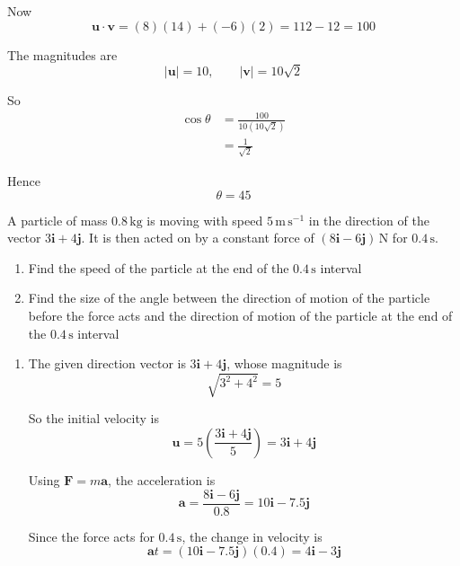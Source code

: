 \documentclass[leqno]{article}
\begin{document}
\begin{enumerate}[
  label=\textbf{\arabic*.},
  leftmargin=*,
  topsep=0pt,
  partopsep=0pt,
  parsep=0pt
]
\begin{djsSolution}
\begin{enumerate}[label=\textbf{(\alph*)}]
Now
\[
\mathbf{u}\cdot\mathbf{v}=(8)(14)+(-6)(2)=112-12=100
\]

The magnitudes are
\[
|\mathbf{u}|=10, \qquad |\mathbf{v}|=10\sqrt{2}
\]

So
\begin{align*}
\cos\theta
&=\frac{100}{10(10\sqrt{2})} \\
&=\frac{1}{\sqrt{2}}
\end{align*}

Hence
\[
\theta=45
\]
\end{enumerate}
\end{djsSolution}


\newpage

\questionitem

A particle of mass $0.8\,\mathrm{kg}$ is moving with speed $5\,\mathrm{m\,s^{-1}}$ in the direction of the vector $3\mathbf{i}+4\mathbf{j}$. It is then acted on by a constant force of $(8\mathbf{i}-6\mathbf{j})\,\mathrm{N}$ for $0.4\,\mathrm{s}$. \\

\begin{enumerate}[label=\textbf{(\alph*)}]
  \item Find the speed of the particle at the end of the $0.4\,\mathrm{s}$ interval  \\
  \item Find the size of the angle between the direction of motion of the particle before the force acts and the direction of motion of the particle at the end of the $0.4\,\mathrm{s}$ interval  \\
\end{enumerate}

\vspace*{10pt}

\begin{djsSolution}
\begin{enumerate}[label=\textbf{(\alph*)}]
  \item The given direction vector is $3\mathbf{i}+4\mathbf{j}$, whose magnitude is
  \[
  \sqrt{3^2+4^2}=5
  \]

  So the initial velocity is
  \[
  \mathbf{u}=5\left(\frac{3\mathbf{i}+4\mathbf{j}}{5}\right)=3\mathbf{i}+4\mathbf{j}
  \]

  Using $\mathbf{F}=m\mathbf{a}$, the acceleration is
  \[
  \mathbf{a}=\frac{8\mathbf{i}-6\mathbf{j}}{0.8}=10\mathbf{i}-7.5\mathbf{j}
  \]

  Since the force acts for $0.4\,\mathrm{s}$, the change in velocity is
  \[
  \mathbf{a}t=(10\mathbf{i}-7.5\mathbf{j})(0.4)=4\mathbf{i}-3\mathbf{j}
  \]


\end{enumerate}
\end{djsSolution}
\end{enumerate}
\end{document}
